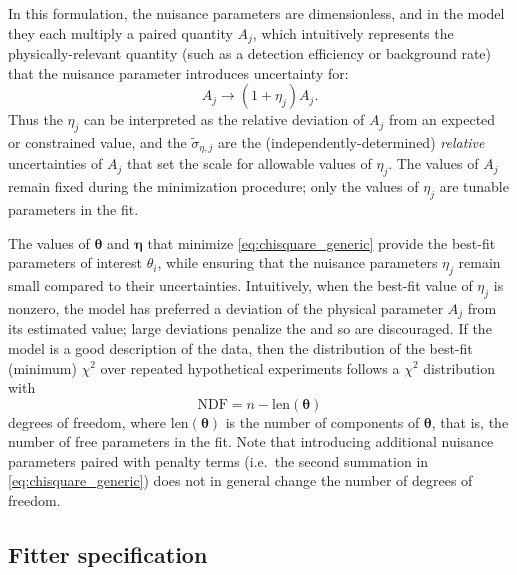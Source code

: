 In this formulation, the nuisance parameters are dimensionless,
and in the model they each multiply a paired quantity $A_j$,
which intuitively represents the physically-relevant quantity
(such as a detection efficiency or background rate)
that the nuisance parameter introduces uncertainty for:
\begin{equation}
    A_j \to (1+\eta_j)A_j.
\end{equation}
Thus the $\eta_j$ can be interpreted as the relative deviation of $A_j$
from an expected or constrained value,
and the $\tilde{\sigma}_{\eta,j}$ are the (independently-determined)
\emph{relative} uncertainties of $A_j$
that set the scale for allowable values of $\eta_j$.
The values of $A_j$ remain fixed during the minimization procedure;
only the values of $\eta_j$ are tunable parameters in the fit.

The values of $\boldsymbol{\theta}$ and $\boldsymbol{\eta}$
that minimize \cref{eq:chisquare_generic}
provide the best-fit parameters of interest $\theta_i$,
while ensuring that the nuisance parameters $\eta_j$
remain small compared to their uncertainties.
Intuitively, when the best-fit value of $\eta_j$ is nonzero,
the model has preferred a deviation of the physical parameter $A_j$ from its estimated value;
large deviations penalize the \chisquare{} and so are discouraged.
If the model is a good description of the data,
then the distribution of the best-fit (minimum) $\chi^2$
over repeated hypothetical experiments
follows a $\chi^2$ distribution with
\begin{equation}\label{eq:ndf_def}
    \text{NDF} = n - \text{len}(\boldsymbol{\theta})
\end{equation}
degrees of freedom,
where $\text{len}(\boldsymbol{\theta})$ is the number of components of $\boldsymbol{\theta}$,
that is, the number of free parameters in the fit.
Note that introducing additional nuisance parameters
paired with penalty terms (i.e.\ the second summation in \cref{eq:chisquare_generic})
does not in general change the number of degrees of freedom.

\subsection{Fitter specification}
\label{subsec:fitter_specification}

